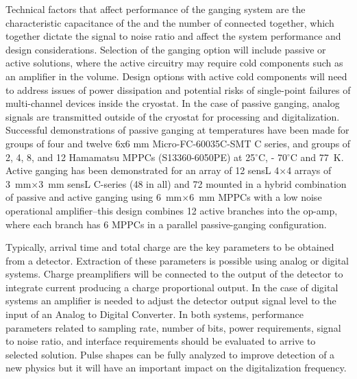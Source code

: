 Technical factors that affect performance of the ganging system are the characteristic capacitance of the  
and the number of  connected together, which together dictate the signal to noise ratio and affect the system 
performance and design considerations. Selection of the ganging option will include passive or active solutions, where the active 
circuitry may require cold components such as an amplifier in the \lar volume. Design options with active cold components will need 
to address issues of power dissipation and potential risks of single-point failures of multi-channel devices inside the cryostat.
In the case of passive ganging, analog signals are transmitted outside of the cryostat for processing and digitalization. 
Successful demonstrations of passive ganging at \lar temperatures have been made for groups of four and twelve 6x6 mm Micro-FC-60035C-SMT C series, and groups of 2, 4, 8, and 12  Hamamatsu MPPCs (S13360-6050PE) at  \num{25}$^\circ$C, - \num{70}$^\circ$C and \SI{77}{K}. Active ganging has been demonstrated for an array of 12 sensL \num{4}$\times$\num{4} arrays of \SI{3}{mm}$\times$\SI{3}{mm} sensL C-series  (48 in all) and  72  mounted in a hybrid combination of passive and active ganging using \SI{6}{mm}$\times$\SI{6}{mm} MPPCs with a low noise operational amplifier--this design combines 12 active branches into the op-amp, where each branch has 6 MPPCs in a parallel passive-ganging configuration.

Typically, arrival time and total charge are the key parameters to be obtained from a detector. Extraction of these parameters 
is possible using analog or digital systems. Charge preamplifiers will be connected to the output of the detector to integrate 
current producing a charge proportional output. In the case of digital systems an amplifier is needed to adjust the detector output signal 
level to the input of an Analog to Digital Converter.  In both systems, performance parameters related  to sampling rate, number of bits, 
power requirements, signal to noise ratio, and interface requirements should be evaluated to arrive to selected solution.  
Pulse shapes can be fully analyzed to improve detection of a new physics but it will have an important impact on the digitalization frequency.

